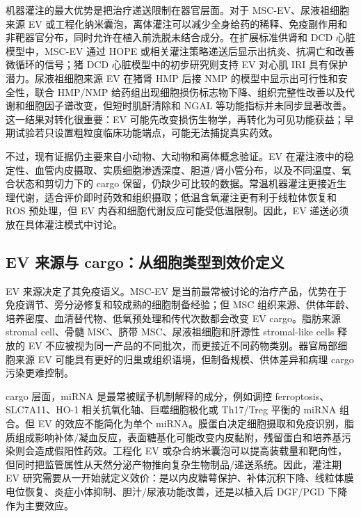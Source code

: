 \documentclass[11pt,a4paper]{article}
\begin{document}
机器灌注的最大优势是把治疗递送限制在器官层面。对于
MSC-EV、尿液祖细胞来源 EV
或工程化纳米囊泡，离体灌注可以减少全身给药的稀释、免疫副作用和非靶器官分布，同时允许在植入前洗脱未结合成分\cite{applicationofmesenchymal2021, extracellularvesiclesderived2022, dynamicconditioningof2024}。在扩展标准供肾和
DCD 心脏模型中，MSC-EV 通过 HOPE
或相关灌注策略递送后显示出抗炎、抗凋亡和改善微循环的信号；猪 DCD
心脏模型中的初步研究则支持 EV 对心肌 IRI
具有保护潜力\cite{protectiveeffectsof2024}。尿液祖细胞来源 EV
在猪肾 HMP 后接 NMP 的模型中显示出可行性和安全性，联合 HMP/NMP 给药组出现细胞损伤标志物下降、组织完整性改善以及代谢和细胞因子谱改变，但短时肌酐清除和
NGAL 等功能指标并未同步显著改善\cite{dynamicconditioningof2024}。这一结果对转化很重要：EV
可能先改变损伤生物学，再转化为可见功能获益；早期试验若只设置粗粒度临床功能端点，可能无法捕捉真实药效。

不过，现有证据仍主要来自小动物、大动物和离体概念验证。EV
在灌注液中的稳定性、血管内皮摄取、实质细胞渗透深度、胆道/肾小管分布，以及不同温度、氧合状态和剪切力下的
cargo
保留，仍缺少可比较的数据。常温机器灌注更接近生理代谢，适合评价即时药效和组织摄取；低温含氧灌注更有利于线粒体恢复和
ROS 预处理，但 EV 内吞和细胞代谢反应可能受低温限制。因此，EV
递送必须放在具体灌注模式中讨论。

\subsection{EV 来源与 cargo：从细胞类型到效价定义}

EV 来源决定了其免疫语义。MSC-EV
是当前最常被讨论的治疗产品，优势在于免疫调节、旁分泌修复和较成熟的细胞制备经验；但 MSC
组织来源、供体年龄、培养密度、血清替代物、低氧预处理和传代次数都会改变 EV
cargo\cite{mesenchymalstemcells2021, thesecretionprofile2022, clinicalapplicationsof2024}。脂肪来源 stromal cell、骨髓 MSC、脐带
MSC、尿液祖细胞和肝源性 stromal-like cells 释放的 EV
不应被视为同一产品的不同批次，而更接近不同药物类别。器官局部细胞来源 EV
可能具有更好的归巢或组织语境，但制备规模、供体差异和病理 cargo
污染更难控制。

cargo 层面，miRNA 是最常被赋予机制解释的成分，例如调控 ferroptosis、SLC7A11、HO-1
相关抗氧化轴、巨噬细胞极化或 Th17/Treg
平衡的 miRNA 组合\cite{mir29a3p2022, mir1243p2022, mesenchymalstemcells2022, mesenchymalstemcell20211}。但
EV 的效应不能简化为单个 miRNA。膜蛋白决定细胞摄取和免疫识别，脂质组成影响补体/凝血反应，表面糖基化可能改变内皮黏附，残留蛋白和培养基污染则会造成假阳性药效。工程化 EV
或杂合纳米囊泡可以提高装载量和靶向性，但同时把监管属性从天然分泌产物推向复杂生物制品/递送系统\cite{extracellularvesiclesas2023, organrepairand2023, geneticmodulationfuture2023}。因此，灌注期 EV
研究需要从一开始就定义效价：是以内皮糖萼保护、补体沉积下降、线粒体膜电位恢复、炎症小体抑制、胆汁/尿液功能改善，还是以植入后 DGF/PGD
下降作为主要效应。
\end{document}
